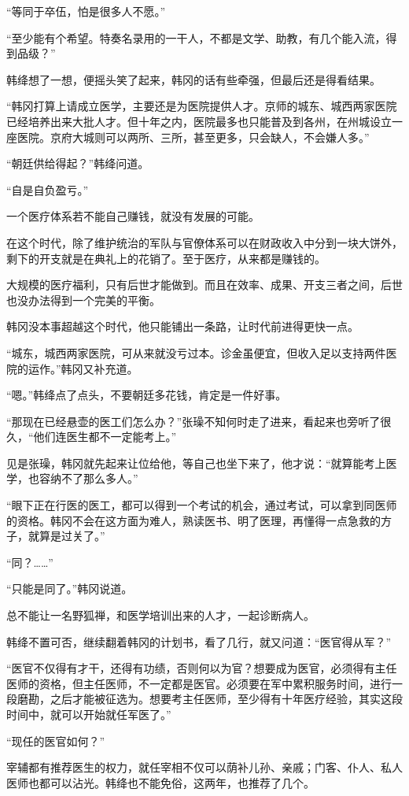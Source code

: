 “等同于卒伍，怕是很多人不愿。”

“至少能有个希望。特奏名录用的一干人，不都是文学、助教，有几个能入流，得到品级？”

韩绛想了一想，便摇头笑了起来，韩冈的话有些牵强，但最后还是得看结果。

“韩冈打算上请成立医学，主要还是为医院提供人才。京师的城东、城西两家医院已经培养出来大批人才。但十年之内，医院最多也只能普及到各州，在州城设立一座医院。京府大城则可以两所、三所，甚至更多，只会缺人，不会嫌人多。”

“朝廷供给得起？”韩绛问道。

“自是自负盈亏。”

一个医疗体系若不能自己赚钱，就没有发展的可能。

在这个时代，除了维护统治的军队与官僚体系可以在财政收入中分到一块大饼外，剩下的开支就是在典礼上的花销了。至于医疗，从来都是赚钱的。

大规模的医疗福利，只有后世才能做到。而且在效率、成果、开支三者之间，后世也没办法得到一个完美的平衡。

韩冈没本事超越这个时代，他只能铺出一条路，让时代前进得更快一点。

“城东，城西两家医院，可从来就没亏过本。诊金虽便宜，但收入足以支持两件医院的运作。”韩冈又补充道。

“嗯。”韩绛点了点头，不要朝廷多花钱，肯定是一件好事。

“那现在已经悬壶的医工们怎么办？”张璪不知何时走了进来，看起来也旁听了很久，“他们连医生都不一定能考上。”

见是张璪，韩冈就先起来让位给他，等自己也坐下来了，他才说：“就算能考上医学，也容纳不了那么多人。”

“眼下正在行医的医工，都可以得到一个考试的机会，通过考试，可以拿到同医师的资格。韩冈不会在这方面为难人，熟读医书、明了医理，再懂得一点急救的方子，就算是过关了。”

“同？……”

“只能是同了。”韩冈说道。

总不能让一名野狐禅，和医学培训出来的人才，一起诊断病人。

韩绛不置可否，继续翻着韩冈的计划书，看了几行，就又问道：“医官得从军？”

“医官不仅得有才干，还得有功绩，否则何以为官？想要成为医官，必须得有主任医师的资格，但主任医师，不一定都是医官。必须要在军中累积服务时间，进行一段磨勘，之后才能被征选为。想要考主任医师，至少得有十年医疗经验，其实这段时间中，就可以开始就任军医了。”

“现任的医官如何？”

宰辅都有推荐医生的权力，就任宰相不仅可以荫补儿孙、亲戚；门客、仆人、私人医师也都可以沾光。韩绛也不能免俗，这两年，也推荐了几个。

